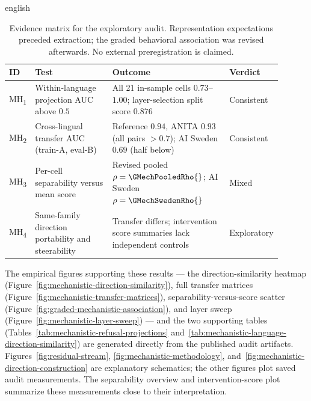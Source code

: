 \begin{otherlanguage*}{english}
\begin{table}[htbp]
\centering
\scriptsize
\caption[Evidence matrix for the refusal-direction audit]{Evidence matrix for the exploratory audit. Representation expectations preceded extraction; the graded behavioral association was revised afterwards. No external preregistration is claimed.}
\label{tab:mechanistic-decision-matrix}
\begin{tabular}{@{}p{0.06\linewidth}p{0.30\linewidth}p{0.44\linewidth}p{0.10\linewidth}@{}}
\toprule
ID & Test & Outcome & Verdict \\
\midrule
MH\textsubscript{1} & Within-language projection AUC above $0.5$ & All 21 in-sample cells $0.73$--$1.00$; layer-selection split score $0.876$ & Consistent \\
MH\textsubscript{2} & Cross-lingual transfer AUC (train-A, eval-B) & Reference $0.94$, ANITA $0.93$ (all pairs $>0.7$); AI Sweden $0.69$ (half below) & Consistent \\
MH\textsubscript{3} & Per-cell separability versus mean score & Revised pooled $\rho=\GMechPooledRho{}$; AI Sweden $\rho=\GMechSwedenRho{}$ & Mixed \\
MH\textsubscript{4} & Same-family direction portability and steerability & Transfer differs; intervention score summaries lack independent controls & Exploratory \\
\bottomrule
\end{tabular}
\end{table}

The empirical figures supporting these results --- the direction-similarity heatmap (Figure~\ref{fig:mechanistic-direction-similarity}), full transfer matrices (Figure~\ref{fig:mechanistic-transfer-matrices}), separability-versus-score scatter (Figure~\ref{fig:graded-mechanistic-association}), and layer sweep (Figure~\ref{fig:mechanistic-layer-sweep}) --- and the two supporting tables (Tables~\ref{tab:mechanistic-refusal-projections} and~\ref{tab:mechanistic-language-direction-similarity}) are generated directly from the published audit artifacts. Figures~\ref{fig:residual-stream}, \ref{fig:mechanistic-methodology}, and~\ref{fig:mechanistic-direction-construction} are explanatory schematics; the other figures plot saved audit measurements. The separability overview and intervention-score plot summarize these measurements close to their interpretation.

\MechTransferAnalysisText


\end{otherlanguage*}
